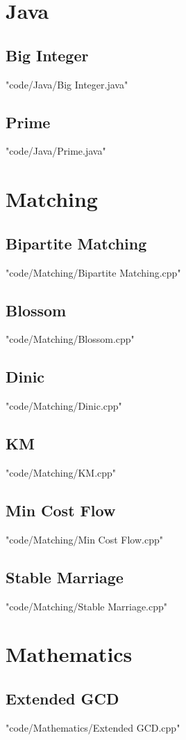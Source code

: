 \documentclass [landscape,8pt,a4paper,twocolumn]{article}
\begin{document}
\section{Java}
\subsection{Big Integer}
 {"code/Java/Big Integer.java"}
\subsection{Prime}
 {"code/Java/Prime.java"}
\section{Matching}
\subsection{Bipartite Matching}
 {"code/Matching/Bipartite Matching.cpp"}
\subsection{Blossom}
 {"code/Matching/Blossom.cpp"}
\subsection{Dinic}
 {"code/Matching/Dinic.cpp"}
\subsection{KM}
 {"code/Matching/KM.cpp"}
\subsection{Min Cost Flow}
 {"code/Matching/Min Cost Flow.cpp"}
\subsection{Stable Marriage}
 {"code/Matching/Stable Marriage.cpp"}
\section{Mathematics}
\subsection{Extended GCD}
 {"code/Mathematics/Extended GCD.cpp"}
\end{document}
